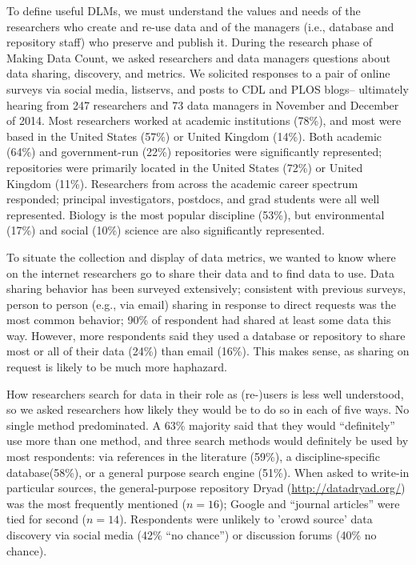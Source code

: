 \documentclass[english]{article}
\begin{document}
To define useful DLMs, we must understand the values and needs of the researchers who create and re-use data and of the managers (i.e., database and repository staff) who preserve and publish it.
During the research phase of Making Data Count, we asked researchers and data managers questions about data sharing, discovery, and metrics.
We solicited responses to a pair of online surveys via social media, listservs, and posts to CDL and PLOS blogs-- ultimately hearing from 247 researchers and 73 data managers in November and December of 2014.
Most researchers worked at academic institutions (78\%), and most were based in the United States (57\%) or United Kingdom (14\%).
Both academic (64\%) and government-run (22\%) repositories were significantly represented; repositories were primarily located in the United States (72\%) or United Kingdom (11\%).
Researchers from across the academic career spectrum responded; principal investigators, postdocs, and grad students were all well represented. 
Biology is the most popular discipline (53\%), but environmental (17\%) and social (10\%) science are also significantly represented. 


To situate the collection and display of data metrics, we wanted to know where on the internet researchers go to share their data and to find data to use. 
Data sharing behavior has been surveyed extensively; consistent with previous surveys\cite{@akers_disciplinary_2013, @wallis_if_2013, @kratz_researcher_2015}, person to person (e.g., via email) sharing in response to direct requests was the most common behavior; 90\% of respondent had shared at least some data this way. 
However, more respondents said they used a database or repository to share most or all of their data (24\%) than email (16\%). 
This makes sense, as sharing on request is likely to be much more haphazard.

How researchers search for data in their role as (re-)users is less well understood, so we asked researchers how likely they would be to do so in each of five ways.
No single method predominated.
A 63\% majority said that they would ``definitely'' use more than one method, and three search methods would definitely be used by most respondents: via references in the literature (59\%), a discipline-specific database(58\%), or a general purpose search engine (51\%). 
When asked to write-in particular sources, the general-purpose repository Dryad (\url{http://datadryad.org/}) was the most frequently mentioned ($n=16$); Google and ``journal articles'' were tied for second ($n=14$). 
Respondents were unlikely to 'crowd source' data discovery via social media (42\% ``no chance'') or discussion forums (40\% no chance). 
\end{document}
